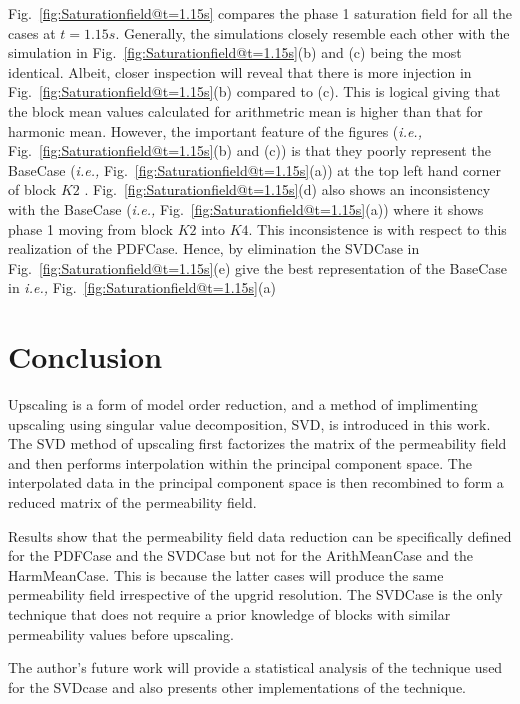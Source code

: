 \documentclass[preprint,12pt]{elsarticle}
\newcommand{\ie}{{\it i.e., }}
\begin{document}
Fig.~\ref{fig:Saturationfield@t=1.15s} compares the phase 1 saturation field for all the cases at $t=1.15s$. Generally, the simulations closely resemble each other with the simulation in Fig.~\ref{fig:Saturationfield@t=1.15s}(b) and (c) being the most identical. Albeit, closer inspection will reveal that there is more injection in Fig.~\ref{fig:Saturationfield@t=1.15s}(b) compared to (c). This is logical giving that the block mean values calculated for arithmetric mean is higher than that for harmonic mean. However, the important feature of the figures (\ie Fig.~\ref{fig:Saturationfield@t=1.15s}(b) and (c)) is that they poorly represent the BaseCase (\ie Fig.~\ref{fig:Saturationfield@t=1.15s}(a)) at the top left hand corner of block $K2$ . Fig.~\ref{fig:Saturationfield@t=1.15s}(d) also shows an inconsistency with the BaseCase (\ie Fig.~\ref{fig:Saturationfield@t=1.15s}(a)) where it shows phase 1 moving from block $K2$ into $K4$. This inconsistence is with respect to this realization of the PDFCase. Hence, by elimination the SVDCase in Fig.~\ref{fig:Saturationfield@t=1.15s}(e) give the best representation of the BaseCase in \ie Fig.~\ref{fig:Saturationfield@t=1.15s}(a)

\section{Conclusion}\label{section:conclusion}

Upscaling is a form of model order reduction, and a method of implimenting upscaling using singular value decomposition, SVD, is introduced in this work. The SVD method of upscaling first factorizes the matrix of the permeability field and then performs interpolation within the principal component space. The interpolated data in the principal component space is then recombined to form a reduced matrix of the permeability field.

Results show that the permeability field data reduction can be specifically defined for the PDFCase and the SVDCase but not for the ArithMeanCase and the HarmMeanCase. This is because the latter cases will produce the same permeability field irrespective of the upgrid resolution. The SVDCase is the only technique that does not require a prior knowledge of blocks with similar permeability values before upscaling.

The author's future work will provide a statistical analysis of the technique used for the SVDcase and also presents other implementations of the technique.
\end{document}

